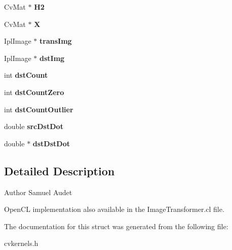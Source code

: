 \begin{DoxyCompactItemize}
Cv\+Mat $\ast$ {\bfseries H2}
\item 
\mbox{\label{struct_kernel_data_a3e975f424d4909b9b5cda65270ac453f}} 
Cv\+Mat $\ast$ {\bfseries X}
\item 
\mbox{\label{struct_kernel_data_a2a8346c10b0dd669387947e819a47ae4}} 
Ipl\+Image $\ast$ {\bfseries trans\+Img}
\item 
\mbox{\label{struct_kernel_data_a51a9e7c0b5cfb06763268de2a78151df}} 
Ipl\+Image $\ast$ {\bfseries dst\+Img}
\item 
\mbox{\label{struct_kernel_data_ade935e960a11a1c927e915197a70e6e1}} 
int {\bfseries dst\+Count}
\item 
\mbox{\label{struct_kernel_data_a5cdcc2174fcbc8f260ed3cf379364b4c}} 
int {\bfseries dst\+Count\+Zero}
\item 
\mbox{\label{struct_kernel_data_a023ed7c5045d190810dc808d2e607c16}} 
int {\bfseries dst\+Count\+Outlier}
\item 
\mbox{\label{struct_kernel_data_a088803d01ae443220b7d49a256102347}} 
double {\bfseries src\+Dst\+Dot}
\item 
\mbox{\label{struct_kernel_data_a11a1a591e74cd0b1c9481b1e09804e3e}} 
double $\ast$ {\bfseries dst\+Dst\+Dot}
\end{DoxyCompactItemize}


\subsection{Detailed Description}
\begin{DoxyAuthor}{Author}
Samuel Audet
\end{DoxyAuthor}
Open\+CL implementation also available in the Image\+Transformer.\+cl file. 

The documentation for this struct was generated from the following file\+:\begin{DoxyCompactItemize}
\item 
cvkernels.\+h\end{DoxyCompactItemize}
